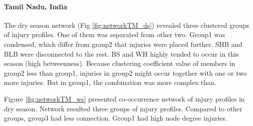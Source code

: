 \paragraph{Tamil Nadu, India}

The dry season network (Fig \ref{fig:networkTM_ds}) revealed three clustered groups of injury profiles. One of them was separated from other two. Group1 was condensed, which differ from group2 that injuries were placed further. SHB and BLB were disconnected to the rest.  BS and WH highly tended to occur in this season (high betweenness).  Because clustering coefficient value of members in group2 less than group1, injuries in group2 might occur together with one or two more injuries. But in group1, the combination was more complex than.

Figure \ref{fig:networkTM_ws} presented co-occurrence network of injury profiles in dry season. Network resulted three groups of injury profiles. Compared to other groups, group3 had less connection. Group1 had high node degree injuries.


